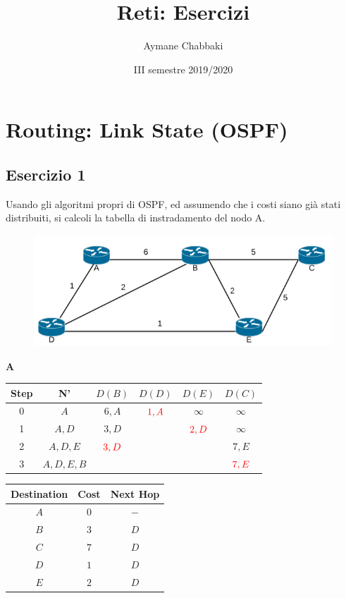 \documentclass[10pt]{article}
\title{Reti: Esercizi}
\author{Aymane Chabbaki}
\date{III semestre 2019/2020}
\begin{document}
	\maketitle
	\tableofcontents
	\newpage
	
\section{Routing: Link State (OSPF)}
	\subsection{Esercizio 1}
	Usando gli algoritmi propri di OSPF, ed assumendo che i costi siano già stati distribuiti, si calcoli la tabella di instradamento del nodo A.
	\begin{figure}[h]
	\centering
	\includegraphics[width=13cm]{es1}
	\end{figure}
	\begin{center}
	\textbf{A}
 		\begin{tabular}{||c c c c c c||} 
 			\hline
 			Step & N' & $D(B)$ & $D(D)$ & $D(E)$ & $D(C)$ \\[0.5ex] 
 			\hline\hline
 			0 & $A$ & $6,A$ & $\color{red} 1,A$ & $\infty$ & $\infty$ \\ 
 			\hline
			1 & $A,D$ & $3,D$ &   & $\color{red}2,D$ & $\infty$ \\
 			\hline
 			2 & $A,D,E$ & $\color{red}3,D$ &   &   & $7,E$ \\
 			\hline
			3 & $A,D,E,B$ &   &   &   & $\color{red}7,E$\\[0.5ex] 
 			\hline
		\end{tabular}
		\quad
		\begin{tabular}{||c || c || c||}
			\hline
 			Destination & Cost & Next Hop\\ [0.5ex] 
 			\hline\hline
			$A$ & $0$ & $-$\\
			$B$ & $3$ & $D$\\
 			$C$ & $7$ & $D$\\
			$D$ & $1$ & $D$\\
			$E$ & $2$ & $D$\\[0.5ex] 
			\hline
		\end{tabular}
	\end{center}
	
\end{document}

